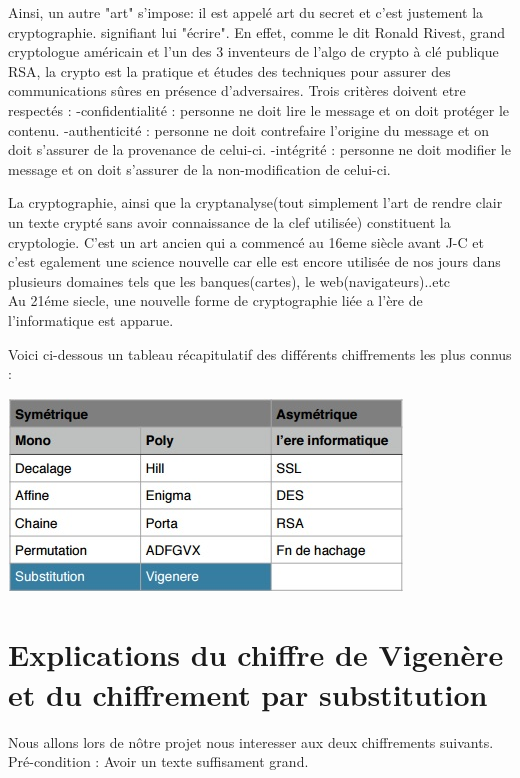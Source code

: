 \documentclass[a4]{article}
\begin{document}
			Ainsi, un autre "art" s'impose: il est appelé art du secret et c'est justement la cryptographie.
			signifiant lui "écrire". En effet, comme le dit Ronald Rivest, grand cryptologue américain et l'un des 3 inventeurs de l'algo
			de crypto à clé publique RSA, la crypto est la pratique et études des techniques pour assurer des communications sûres en présence d'adversaires.
			Trois critères doivent etre respectés : 
			-confidentialité : personne ne doit lire le message et on doit protéger le contenu.
			-authenticité : personne ne doit contrefaire l'origine du message et on doit s'assurer de la 							provenance de celui-ci.
			-intégrité : personne ne doit modifier le message et on doit s'assurer de la non-modification 							de celui-ci.

			La cryptographie, ainsi que la cryptanalyse(tout simplement l'art de rendre clair un texte crypté sans avoir connaissance de la clef utilisée) constituent la cryptologie.
			C'est un art ancien qui a commencé au 16eme siècle avant J-C et c'est egalement une science nouvelle car elle est encore utilisée de nos jours dans plusieurs domaines tels que les banques(cartes), le web(navigateurs)..etc\\
			Au 21éme siecle, une nouvelle forme de cryptographie liée a l'ère de l'informatique est apparue.
			
			Voici ci-dessous un tableau récapitulatif des différents chiffrements les plus connus :
			\\
			\begin{center}\includegraphics[scale=0.6]{Tab1.jpg}\end{center}
	
	\section{Explications du chiffre de Vigenère et du chiffrement par substitution}
		Nous allons lors de nôtre projet nous interesser aux deux chiffrements suivants.\\
		Pré-condition : Avoir un texte suffisament grand. 
\end{document}
